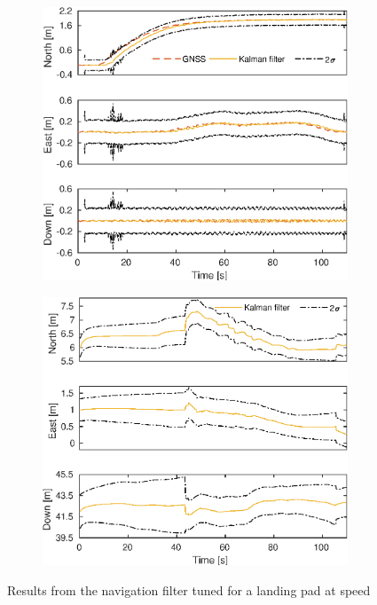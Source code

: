 \begin{figure}
	\begin{subfigure}{.48\linewidth}
		\includegraphics[width=\linewidth]{img/plot/dynamic/dynamic_7_vel.eps}
		\label{fig:kalmanTuningDynamic7Vel}
	\end{subfigure}
	\begin{subfigure}{.48\linewidth}
		\includegraphics[width=\linewidth]{img/plot/dynamic/dynamic_7_bias.eps}
		\label{fig:kalmanTuningDynamic7Bias}
	\end{subfigure}
	\caption{Results from the navigation filter tuned for a landing pad at speed}\label{fig:kalmanTuningDynamic7}
\end{figure}
